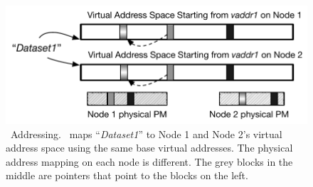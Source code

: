 {
\begin{figure}[t]
\begin{center}
\centerline{\includegraphics[width=\textwidth]{hotpot/Figures/addressing.pdf}}
\caption[\hotpot\ Addressing.]
{\hotpot\ Addressing.
\hotpot\ maps ``{\em Dataset1}'' to Node 1 and Node 2's virtual address space using the 
same base virtual addresses. The physical address mapping on each node is different.
The grey blocks in the middle are pointers that point to the blocks on the left. 
}
\label{fig-hotpot-addressing}
\end{center}
\end{figure}
}